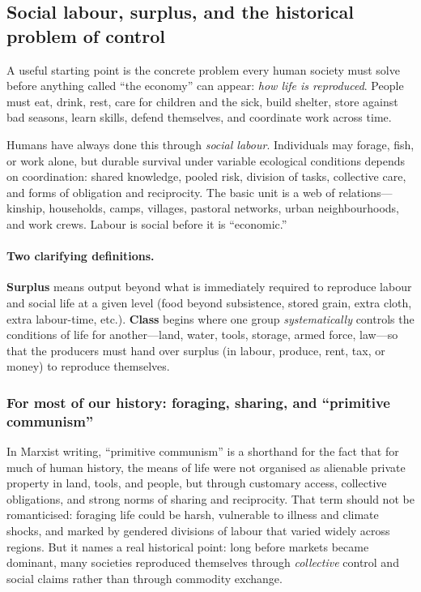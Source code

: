 \subsection{Social labour, surplus, and the historical problem of control}
\label{sec:sociallabour-surplus-control}

A useful starting point is the concrete problem every human society must solve before anything called ``the economy'' can appear: \emph{how life is reproduced}.
People must eat, drink, rest,
care for children and the sick, build shelter, store against bad seasons, learn skills, defend
themselves, and coordinate work across time.

Humans have always done this through \emph{social labour}. Individuals may forage, fish,
or work alone, but durable survival under variable ecological conditions depends on
coordination: shared knowledge, pooled risk, division of tasks, collective care, and forms
of obligation and reciprocity.\cite{LeeDaly1999} The basic unit is a web of
relations---kinship, households, camps, villages, pastoral networks, urban neighbourhoods,
and work crews. Labour is social before it is ``economic.''

\paragraph{Two clarifying definitions.}
\textbf{Surplus} means output beyond what is immediately required to reproduce labour and social life
at a given level (food beyond subsistence, stored grain, extra cloth, extra labour-time, etc.).
\textbf{Class} begins where one group \emph{systematically} controls the conditions of life for another---land,
water, tools, storage, armed force, law---so that the producers must hand over surplus (in labour, produce,
rent, tax, or money) to reproduce themselves.

\subsubsection{For most of our history: foraging, sharing, and ``primitive communism''}
\label{sec:foraging-primitive-communism}

In Marxist writing, ``primitive communism'' is a shorthand for the fact that for much of human history,
the means of life were not organised as alienable private property in land, tools, and people, but through
customary access, collective obligations, and strong norms of sharing and reciprocity. That term should not
be romanticised: foraging life could be harsh, vulnerable to illness and climate shocks, and marked by
gendered divisions of labour that varied widely across regions. But it names a real historical point:
long before markets became dominant, many societies reproduced themselves through \emph{collective} control
and social claims rather than through commodity exchange.\cite{LeeDaly1999,Woodburn1982,Boehm1999}

